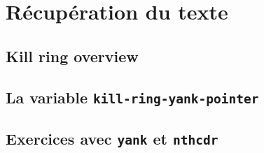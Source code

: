 \chapter{Récupération du texte}

\section{Kill ring overview}

\section{La variable \texttt{kill-ring-yank-pointer}}

\section{Exercices avec \texttt{yank} et \texttt{nthcdr}}

